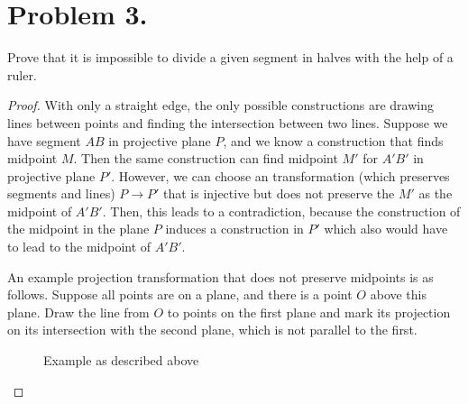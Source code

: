 \documentclass{article}
\begin{document}
\section{Problem 3.}
Prove that it is impossible to divide a given segment in halves with the help of a ruler.
\begin{proof}
With only a straight edge, the only possible constructions are drawing lines between points and finding the intersection between two lines. Suppose we have segment $AB$ in projective plane $P$, and we know a construction that finds midpoint $M$. Then the same construction can find midpoint $M'$ for $A'B'$ in projective plane $P'$. However, we can choose an transformation (which preserves segments and lines) $P\rightarrow P'$  that is injective but does not preserve the $M'$ as the midpoint of $A'B'$. Then, this leads to a contradiction, because the construction of the midpoint in the plane $P$ induces a construction in $P'$ which also would have to lead to the midpoint of $A'B'$.
\par An example projection transformation that does not preserve midpoints is as follows. Suppose all points are on a plane, and there is a point $O$ above this plane. Draw the line from $O$ to points on the first plane and mark its projection on its intersection with the second plane, which is not parallel to the first.

\begin{figure}[ht]
    \centering
    
    \caption{Example as described above}
\end{figure}

\end{proof}
\end{document}

